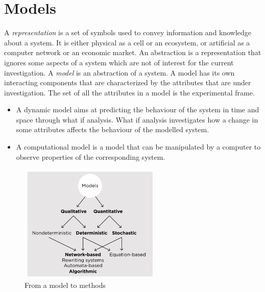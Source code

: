 \section{Models}
A \emph{representation} is a set of symbols used to convey information and knowledge about a system.
It is either physical as a cell or an ecosystem, or artificial as a computer network or an economic market.
An abstraction is a representation that ignores some aspects of a system which are not of interest for the current investigation.
A \emph{model} is an abstraction of a system.
A model has its own interacting components that are characterized by the attributes that are under investigation.
The set of all the attributes in a model is the experimental frame.

\begin{multicols}{2}
  \begin{itemize}
    \item A dynamic model aims at predicting the behaviour of the system in time and space through what if analysis.
      What if analysis investigates how a change in some attributes affects the behaviour of the modelled system.
    \item A computational model is a model that can be manipulated by a computer to observe properties of the corresponding system.
  \end{itemize}
\end{multicols}

\begin{figure}[H]
  \centering
  \includegraphics[width=0.6\textwidth]{scheme_model.png}
  \caption{From a model to methods}
\end{figure}


